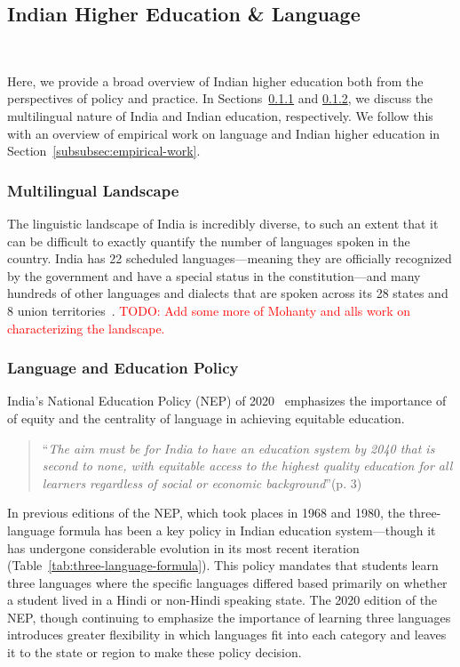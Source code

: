 \subsection{Indian Higher Education \& Language}~\label{subsec:indian-higher-education}

Here, we provide a broad overview of Indian higher education both from the
perspectives of policy and practice. In
Sections~\ref{subsubsec:multilingualism-in-indian-education} and
\ref{subsubsec:language-and-education-policy}, we discuss the multilingual
nature of India and Indian education, respectively. We follow this with an
overview of empirical work on language and Indian higher education in
Section~\ref{subsubsec:empirical-work}.

\subsubsection{Multilingual Landscape}\label{subsubsec:multilingualism-in-indian-education}

The linguistic landscape of India is incredibly diverse, to such an extent that
it can be difficult to exactly quantify the number of languages spoken in the
country. India has 22 scheduled languages---meaning they are officially
recognized by the government and have a special status in the constitution---and 
many hundreds of other languages and dialects that are spoken across its 28
states and 8 union territories~\cite{2011census}. \textcolor{red}{TODO: Add 
some more of Mohanty and alls work on characterizing the landscape.}


\subsubsection{Language and Education
Policy}\label{subsubsec:language-and-education-policy}

India's National Education Policy (NEP) of 2020~\cite{NEP2020} emphasizes the importance of
of equity and the centrality of language in achieving equitable education.
\begin{quote}
  ``\textit{The aim must be for India to have an education system by 2040 that
  is second to none, with equitable access to the highest quality education for
  all learners regardless of social or economic background}''(p. 3)
\end{quote}
In previous editions of the NEP, which took places in 1968 and 1980, the
three-language formula has been a key policy in Indian education system---though
it has undergone considerable evolution in its most recent iteration
(Table~\ref{tab:three-language-formula}). This policy mandates that students
learn three languages where the specific languages differed based primarily on
whether a student lived in a Hindi or non-Hindi speaking state. The 2020 edition
of the NEP, though continuing to emphasize the importance of learning three
languages introduces greater flexibility in which languages fit into each
category and leaves it to the state or region to make these policy decision.

